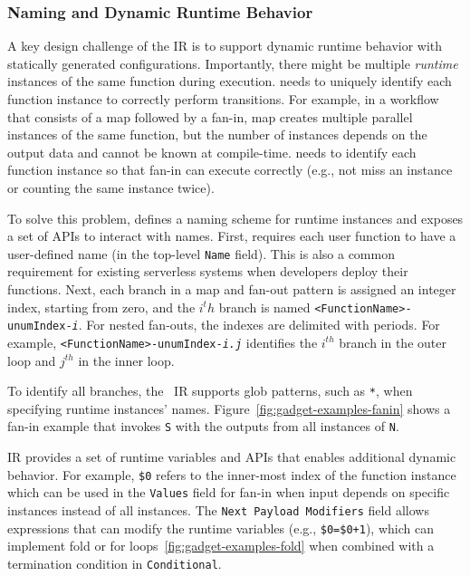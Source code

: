 \subsubsection{Naming and Dynamic Runtime Behavior}\label{sec:ir:naming}

A key design challenge of the \name{} IR is to support dynamic runtime
behavior with statically generated configurations. Importantly, there might be
multiple \emph{runtime} instances of the same function during execution.
\name{} needs to uniquely identify each function instance to correctly perform
transitions. For example, in a workflow that consists of a map followed by a
fan-in, map creates multiple parallel instances of the same function, but the
number of instances depends on the output data and cannot be known at
compile-time. \name{} needs to identify each function instance so that fan-in
can execute correctly (e.g., not miss an instance or counting the same
instance twice).

To solve this problem, \name{} defines a naming scheme for runtime instances
and exposes a set of APIs to interact with names. First,
\name{} requires each user function to have a user-defined name (in the
top-level \texttt{Name} field). This is also a common requirement for existing
serverless systems when developers deploy their functions. Next, each branch
in a map and fan-out pattern is assigned an integer index,
starting from zero, and the $i^th$ branch is named
\texttt{<FunctionName>-unumIndex-\emph{i}}. For nested fan-outs, the indexes
are delimited with periods. For example,
\texttt{<FunctionName>-unumIndex-\emph{i.j}} identifies the $i^{th}$ branch in
the outer loop and $j^{th}$ in the inner loop.

To identify all branches, the \name{}~IR supports glob patterns, such as
\texttt{*}, when specifying runtime instances' names.
Figure~\ref{fig:gadget-examples-fanin} shows a fan-in example that invokes
\texttt{S} with the outputs from all instances of \texttt{N}.

\name{} IR provides a set of runtime variables and APIs that enables
additional dynamic behavior. For example, \texttt{\$0} refers to the
inner-most index of the function instance which can be used in the
\texttt{Values} field for fan-in when input depends on specific instances
instead of all instances. The \texttt{Next Payload Modifiers} field allows
expressions that can modify the runtime variables (e.g., \texttt{\$0=\$0+1}),
which can implement fold or for loops~\ref{fig:gadget-examples-fold} when
combined with a termination condition in \texttt{Conditional}.

